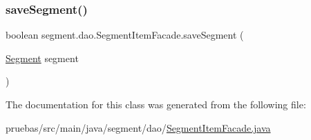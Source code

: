 \subsubsection{\texorpdfstring{save\+Segment()}{saveSegment()}}
{\footnotesize\ttfamily boolean segment.\+dao.\+Segment\+Item\+Facade.\+save\+Segment (\begin{DoxyParamCaption}\item[{\mbox{\hyperlink{classclases_1_1_segment}{Segment}}}]{segment }\end{DoxyParamCaption})}



The documentation for this class was generated from the following file\+:\begin{DoxyCompactItemize}
\item 
pruebas/src/main/java/segment/dao/\mbox{\hyperlink{_segment_item_facade_8java}{Segment\+Item\+Facade.\+java}}\end{DoxyCompactItemize}
